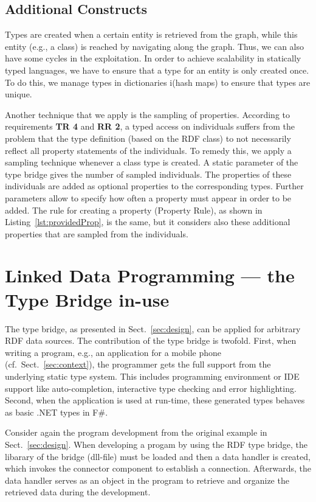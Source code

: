 \documentclass{llncs} %
\newcommand{\fs}{\textsf{F\#}\xspace}
\newcommand{\rr}[1]{\textbf{RR #1}}
\newcommand{\tr}[1]{\textbf{TR #1}}
\begin{document}
\subsection{Additional Constructs}

Types are created when a certain entity is retrieved from the graph, while this entity (e.g., a class) is reached
by navigating along the graph. Thus, we can also have some cycles in the exploitation. In order to achieve scalability in
statically typed languages, we have to ensure that a type for an entity is only created once.
To do this, we manage types in dictionaries i(hash maps) to ensure that types are unique.

Another technique that we apply is the sampling of properties. According to requirements \tr{4} and \rr{2},  a typed access on individuals
suffers from the problem that the type definition (based on the RDF class) to not necessarily reflect all property statements
of the individuals. To remedy this, we apply a sampling technique whenever a class type is created.
A static parameter of the type bridge gives the number of sampled individuals. The properties of these individuals
are added as optional properties to the corresponding types. Further parameters allow to specify
how often a property must appear in order to be added.
The rule for creating a property (Property Rule), as shown in Listing~\ref{lst:providedProp},
is the same, but it considers also these additional properties that are  sampled from
the individuals.
	
\section{Linked Data Programming --- the Type Bridge in-use}
\label{sec:usage}

The type bridge, as presented in Sect.~\ref{sec:design}, can be applied for arbitrary RDF data sources.
The contribution of the type bridge is twofold. First, when writing a program, e.g., an application for a mobile phone (cf.~Sect.~\ref{sec:context}),
the programmer gets the full support from the underlying static type system. This includes programming environment
or IDE support like auto-completion, interactive type checking and error highlighting.
Second, when the application is used at run-time, these generated types behaves as basic .NET types in \fs.

Consider again the program development from the original example in Sect.~\ref{sec:design}.
When developing a progam by using the RDF type bridge, the libarary of the bridge (dll-file) must
be loaded and then a data handler is created, which invokes the connector component to
establish a connection. Afterwards, the data handler
serves as an object in the program to retrieve and organize the retrieved data during the development.
\end{document}
